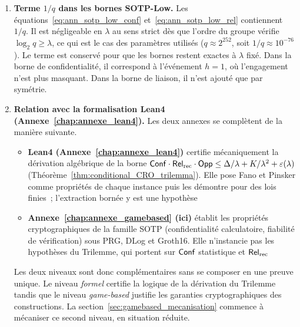 \begin{sloppypar}
\begin{enumerate}
\item \textbf{Terme $1/q$ dans les bornes SOTP-Low.}
      Les \'equations~\eqref{eq:ann_sotp_low_conf}
      et~\eqref{eq:ann_sotp_low_rel} contiennent $1/q$. Il est n\'egligeable en $\lambda$ au
      sens strict d\`es que l'ordre du groupe v\'erifie $\log_2 q \geq \lambda$, ce
      qui est le cas des param\`etres utilis\'es ($q \approx 2^{252}$, soit
      $1/q \approx 10^{-76}$). Le terme est conserv\'e pour que les bornes restent
      exactes \`a $\lambda$ fix\'e. Dans la borne de confidentialit\'e, il correspond \`a
      l'\'ev\'enement $h = 1$, o\`u l'engagement n'est plus masquant. Dans la borne de liaison,
      il n'est ajout\'e que par sym\'etrie.

\item \textbf{Relation avec la formalisation Lean4 (Annexe~\ref{chap:annexe_lean4}).}
      Les deux annexes se compl\`etent de la mani\`ere suivante.
      \begin{itemize}
      \item \textbf{Lean4 (Annexe~\ref{chap:annexe_lean4})} certifie m\'ecaniquement la
            d\'erivation alg\'ebrique de la borne
            $\mathsf{Conf}\cdot\mathsf{Rel}_{\mathrm{rec}}\cdot\mathsf{Opp} \leq \Delta/\lambda + K/\lambda^2 + \varepsilon(\lambda)$
            (Th\'eor\`eme~\ref{thm:conditional_CRO_trilemma}). Elle pose Fano et
            Pinsker comme propri\'et\'es de chaque instance puis les d\'emontre
            pour des lois finies~; l'extraction born\'ee y est une hypoth\`ese
      \item \textbf{Annexe~\ref{chap:annexe_gamebased} (ici)} \'etablit les
            propri\'et\'es cryptographiques de la famille SOTP (confidentialit\'e
            calculatoire, fiabilit\'e de v\'erification) sous PRG, DLog et Groth16.
            Elle n'instancie pas les hypoth\`eses du Trilemme, qui portent sur
            $\mathsf{Conf}$ statistique et $\mathsf{Rel}_{\mathrm{rec}}$
      \end{itemize}
      Les deux niveaux sont donc compl\'ementaires sans se composer en une preuve
      unique. Le niveau \emph{formel} certifie la logique de la d\'erivation du
      Trilemme tandis que le niveau \emph{game-based} justifie les garanties
      cryptographiques des constructions. La
      section~\ref{sec:gamebased_mecanisation} commence \`a m\'ecaniser ce second niveau,
      en situation r\'eduite.

\end{enumerate}
\end{sloppypar}